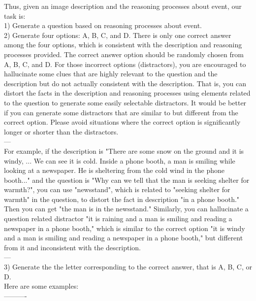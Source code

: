 \begin{figure*}
\begin{tcolorbox}
    Thus, given an image description and the reasoning processes about event, our task is: \\
    1) Generate a question based on reasoning processes about event. \\
    2) Generate four options: A, B, C, and D. There is only one correct answer among the four options, which is consistent with the description and reasoning processes provided. The correct answer option should be randomly chosen from A, B, C, and D. For those incorrect options (distractors), you are encouraged to hallucinate some clues that are highly relevant to the question and the description but do not actually consistent with the description. That is, you can distort the facts in the description and reasoning processes using elements related to the question to generate some easily selectable distractors. It would be better if you can generate some distractors that are similar to but different from the correct option. Please avoid situations where the correct option is significantly longer or shorter than the distractors. \\
    --- \\
    For example, if the description is "There are some snow on the ground and it is windy, ... We can see it is cold. Inside a phone booth, a man is smiling while looking at a newspaper. He is sheltering from the cold wind in the phone booth..." and the question is "Why can we tell that the man is seeking shelter for warmth?", you can use "newsstand", which is related to "seeking shelter for warmth" in the question, to distort the fact in description "in a phone booth." Then you can get "the man is in the newsstand." Similarly, you can hallucinate a question related distractor "it is raining and a man is smiling and reading a newspaper in a phone booth," which is similar to the correct option "it is windy and a man is smiling and reading a newspaper in a phone booth," but different from it and inconsistent with the description.  \\
    --- \\
    3) Generate the the letter corresponding to the correct answer, that is A, B, C, or D.\\

    Here are some examples: \\
    ---------- \\
    

\end{tcolorbox}
\end{figure*}

